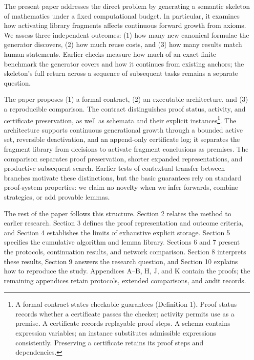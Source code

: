\documentclass[pdflatex,sn-basic,Numbered]{sn-jnl}
\begin{document}
The present paper addresses the direct problem by generating a semantic skeleton of mathematics under a fixed computational budget. In particular, it examines how activating library fragments affects continuous forward growth from axioms. We assess three independent outcomes: (1) how many new canonical formulae the generator discovers, (2) how much reuse costs, and (3) how many results match human statements. Earlier checks measure how much of an exact finite benchmark the generator covers and how it continues from existing anchors; the skeleton's full return across a sequence of subsequent tasks remains a separate question.

The paper proposes (1) a formal contract, (2) an executable architecture, and (3) a reproducible comparison. The contract distinguishes proof status, activity, and certificate preservation, as well as schemata and their explicit instances\footnote{A formal contract states checkable guarantees (Definition 1). Proof status records whether a certificate passes the checker; activity permits use as a premise. A certificate records replayable proof steps. A schema contains expression variables; an instance substitutes admissible expressions consistently. Preserving a certificate retains its proof steps and dependencies.}. The architecture supports continuous generational growth through a bounded active set, reversible deactivation, and an append-only certificate log; it separates the fragment library from decisions to activate fragment conclusions as premises. The comparison separates proof preservation, shorter expanded representations, and productive subsequent search. Earlier tests of contextual transfer between branches motivate these distinctions, but the basic guarantees rely on standard proof-system properties: we claim no novelty when we infer forwards, combine strategies, or add provable lemmas.

The rest of the paper follows this structure. Section 2 relates the method to earlier research. Section 3 defines the proof representation and outcome criteria, and Section 4 establishes the limits of exhaustive explicit storage. Section 5 specifies the cumulative algorithm and lemma library. Sections 6 and 7 present the protocols, continuation results, and network comparison. Section 8 interprets these results, Section 9 answers the research question, and Section 10 explains how to reproduce the study. Appendices A--B, H, J, and K contain the proofs; the remaining appendices retain protocols, extended comparisons, and audit records.
\end{document}
